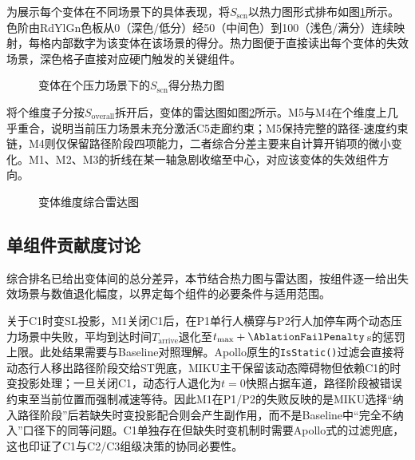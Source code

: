 \begin{table}[htbp]
\centering
\caption{\AblationVariantTotal{}变体综合评分与排名}
\label{tab:ablation_score}
\small
\resizebox{\textwidth}{!}{%
%
}
\end{table}

为展示每个变体在不同场景下的具体表现，将$S_{\mathrm{scn}}$以热力图形式排布如图\ref{fig:ablation_heatmap}所示。色阶由RdYlGn色板从0（深色/低分）经50（中间色）到100（浅色/满分）连续映射，每格内部数字为该变体在该场景的得分。热力图便于直接读出每个变体的失效场景，深色格子直接对应硬门触发的关键组件。

\begin{figure}[H]
\centering
{}
\caption{\AblationVariantTotal{}变体在\AblationScenarioTotal{}个压力场景下的$S_{\mathrm{scn}}$得分热力图}
\label{fig:ablation_heatmap}
\end{figure}

将\ScoreDimensionCount{}个维度子分按$S_{\mathrm{overall}}$拆开后，\AblationVariantTotal{}变体的雷达图如图\ref{fig:ablation_radar}所示。M5与M4在\ScoreDimensionCount{}个维度上几乎重合，说明当前压力场景未充分激活C5走廊约束；M5保持完整的路径-速度约束链，M4则仅保留路径阶段四项能力，二者综合分差主要来自计算开销项的微小变化。M1、M2、M3的折线在某一轴急剧收缩至中心，对应该变体的失效组件方向。

\begin{figure}[H]
\centering
{}    
\caption{\AblationVariantTotal{}变体\ScoreDimensionCount{}维度综合雷达图}
\label{fig:ablation_radar}
\end{figure}

\subsection{单组件贡献度讨论}

综合排名已给出变体间的总分差异，本节结合热力图与雷达图，按组件逐一给出失效场景与数值退化幅度，以界定每个组件的必要条件与适用范围。

关于C1时变SL投影，M1关闭C1后，在P1单行人横穿与P2行人加停车两个动态压力场景中失败，平均到达时间$T_{\mathrm{arrive}}$退化至$t_{\max}+\AblationFailPenalty$\,s的惩罚上限。此处结果需要与Baseline对照理解。Apollo原生的\texttt{IsStatic()}过滤会直接将动态行人移出路径阶段交给ST兜底，MIKU主干保留该动态障碍物但依赖C1的时变投影处理；一旦关闭C1，动态行人退化为$t=0$快照占据车道，路径阶段被错误约束至当前位置而强制减速等待。因此M1在P1/P2的失败反映的是MIKU选择“纳入路径阶段”后若缺失时变投影配合则会产生副作用，而不是Baseline中“完全不纳入”口径下的同等问题。C1单独存在但缺失时变机制时需要Apollo式的过滤兜底，这也印证了C1与C2/C3组级决策的协同必要性。

